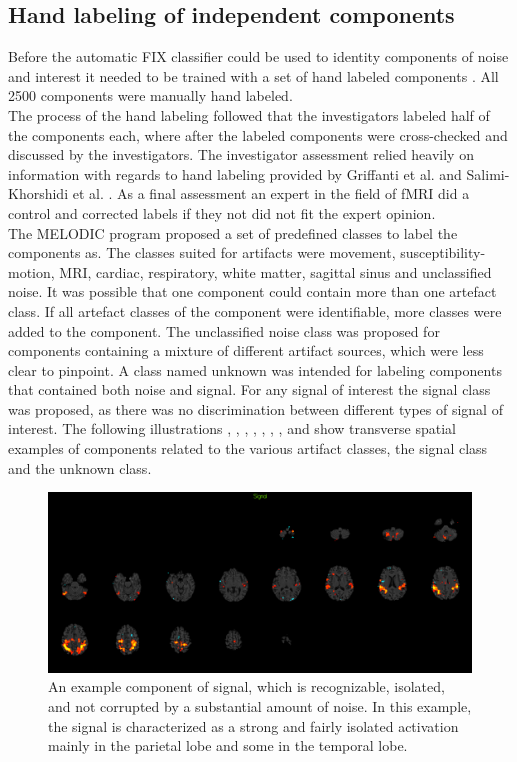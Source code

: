 \subsection{Hand labeling of independent components}
Before the automatic FIX classifier could be used to identity components of noise and interest it needed to be trained with a set of hand labeled components \cite{Salimi-Khorshidi2014}. All 2500 components were manually hand labeled. \\
The process of the hand labeling followed that the investigators labeled half of the components each, where after the labeled components were cross-checked and discussed by the investigators. The investigator assessment relied heavily on information with regards to hand labeling provided by Griffanti et al. \cite{Griffanti2017} and Salimi-Khorshidi et al. \cite{Salimi-Khorshidi2014}. As a final assessment an expert in the field of fMRI did a control and corrected labels if they not did not fit the expert opinion. \\
The MELODIC program proposed a set of predefined classes to label the components as. The classes suited for artifacts were movement, susceptibility-motion, MRI, cardiac, respiratory, white matter, sagittal sinus and unclassified noise. It was possible that one component could contain more than one artefact class. If all artefact classes of the component were identifiable, more classes were added to the component. The unclassified noise class was proposed for components containing a mixture of different artifact sources, which were less clear to pinpoint. A class named unknown was intended for labeling components that contained both noise and signal. For any signal of interest the signal class was proposed, as there was no discrimination between different types of signal of interest. 
The following illustrations , , , , , , ,  and  show transverse spatial examples of components related to the various artifact classes, the signal class and the unknown class.

\begin{figure}[H]                 
	\includegraphics[width=.85\textwidth]{figures/bMethods/signal}  
	\caption{An example component of signal, which is recognizable, isolated, and not corrupted by a substantial amount of noise. In this example, the signal is characterized as a strong and fairly isolated activation mainly in the parietal lobe and some in the temporal lobe.}
	\label{fig:meth:signal} 
\end{figure}



